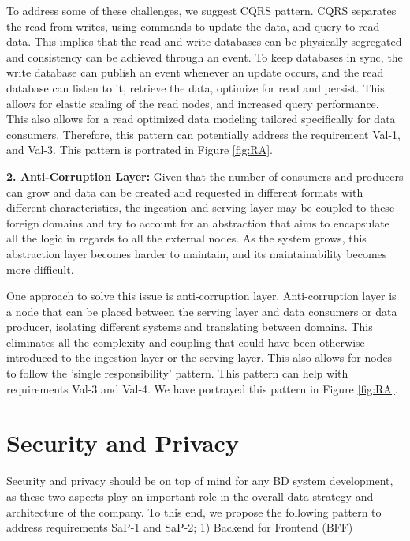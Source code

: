 \documentclass[a4paper,11pt,article,oneside]{memoir}
\begin{document}
To address some of these challenges, we suggest CQRS pattern. CQRS separates the read from writes, using commands to update the data, and query to read data. This implies that the read and write databases can be physically segregated and consistency can be achieved through an event. To keep databases in sync, the write database can publish an event whenever an update occurs, and the read database can listen to it, retrieve the data, optimize for  read and persist. This allows for elastic scaling of the read nodes, and increased query performance. This also allows for a read optimized data modeling tailored specifically for data consumers. Therefore, this pattern can potentially address the requirement Val-1, and Val-3. This pattern is portrated in Figure \ref{fig:RA}.

\vspace{6px}
\textbf{2. Anti-Corruption Layer:} Given that the number of consumers and producers can grow and data can be created and requested in different formats with different characteristics, the ingestion and serving layer may be coupled to these foreign domains and try to account for an abstraction that aims to encapsulate all the logic in regards to all the external nodes. As the system grows, this abstraction layer becomes harder to maintain, and its maintainability becomes more difficult. 

One approach to solve this issue is anti-corruption layer. Anti-corruption layer is a node that can be placed between the serving layer and data consumers or data producer, isolating different systems and translating between domains. This eliminates all the complexity and coupling that could have been otherwise introduced to the ingestion layer or the serving layer. This also allows for nodes to follow the 'single responsibility' pattern. This pattern can help with requirements Val-3 and Val-4. We have portrayed this pattern in Figure \ref{fig:RA}.


\section{Security and Privacy}

Security and privacy should be on top of mind for any BD system development, as these two aspects play an important role in the overall data strategy and architecture of the company. To this end, we propose the following pattern to address requirements SaP-1 and SaP-2; 1) Backend for Frontend (BFF)
\end{document}
